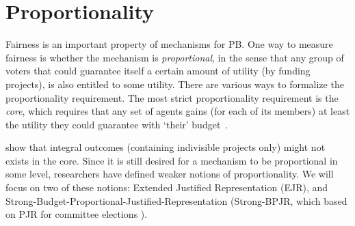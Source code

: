 \documentclass[runningheads]{llncs}
\newcommand{\kibitz}[2]{\ifnum\Comments=1{\color{#1}{#2}}\fi}
\newcommand{\rf}[1]{\kibitz{blue}{[Roy says:#1]}}
\begin{document}


\section{Proportionality}
\label{sec:prop}
Fairness is an important property of mechanisms for   PB. One way to measure fairness is whether the mechanism is  \emph{proportional}, in the sense that any group of voters that could guarantee   itself a certain amount of utility (by funding  projects), is also entitled to some utility.
There are various ways to formalize the proportionality requirement. The most strict proportionality requirement is the \emph{core}, which requires that any set of agents gains (for each of its members) at least the utility they could guarantee with `their' budget~\cite{fain2016core, fain2018fair}. %



\citet{fain2018fair} show that integral outcomes (containing indivisible projects only) might not exists in the core.
Since it is still desired for a mechanism to be proportional in some level, researchers have   defined  weaker notions of proportionality. We will focus on two of these notions: Extended Justified Representation (EJR)\cite{peters2020proportional}, and Strong-Budget-Proportional-Justified-Representation \cite{aziz2017proportionally} (Strong-BPJR, which based on PJR for committee elections \cite{aziz2017justified,sanchez2016proportional}).%
\end{document}
